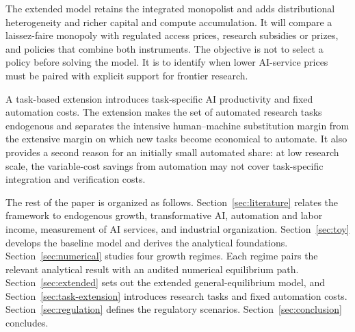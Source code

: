 The extended model retains the integrated monopolist and adds distributional
heterogeneity and richer capital and compute accumulation. It will compare a
laissez-faire monopoly with regulated access prices, research subsidies or prizes,
and policies that combine both instruments. The objective is not to select a policy
before solving the model. It is to identify when lower AI-service prices must be
paired with explicit support for frontier research.

A task-based extension introduces task-specific AI productivity and fixed
automation costs. The extension makes the set of automated research tasks
endogenous and separates the intensive human--machine substitution margin from the
extensive margin on which new tasks become economical to automate. It also provides
a second reason for an initially small automated share: at low research scale, the
variable-cost savings from automation may not cover task-specific integration and
verification costs.

The rest of the paper is organized as follows. Section~\ref{sec:literature} relates
the framework to endogenous growth, transformative AI, automation and labor income,
measurement of AI services, and industrial organization. Section~\ref{sec:toy}
develops the baseline model and derives the analytical foundations.
Section~\ref{sec:numerical} studies four growth regimes. Each regime pairs the
relevant analytical result with an audited numerical equilibrium path.
Section~\ref{sec:extended} sets out the extended general-equilibrium model, and
Section~\ref{sec:task-extension} introduces research tasks and fixed automation
costs.
Section~\ref{sec:regulation} defines the regulatory scenarios.
Section~\ref{sec:conclusion} concludes.
